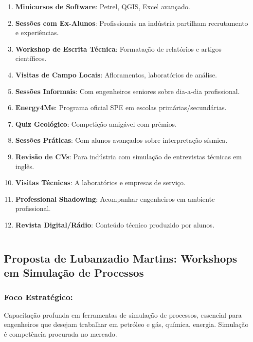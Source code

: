 \documentclass[12pt,a4paper]{article}
\begin{document}
\begin{enumerate}[itemsep=0.2cm]
    \item \textbf{Minicursos de Software}: Petrel, QGIS, Excel avançado.
    
    \item \textbf{Sessões com Ex-Alunos}: Profissionais na indústria partilham recrutamento e experiências.
    
    \item \textbf{Workshop de Escrita Técnica}: Formatação de relatórios e artigos científicos.
    
    \item \textbf{Visitas de Campo Locais}: Afloramentos, laboratórios de análise.
    
    \item \textbf{Sessões Informais}: Com engenheiros seniores sobre dia-a-dia profissional.
    
    \item \textbf{Energy4Me}: Programa oficial SPE em escolas primárias/secundárias.
    
    \item \textbf{Quiz Geológico}: Competição amigável com prémios.
    
    \item \textbf{Sessões Práticas}: Com alunos avançados sobre interpretação sísmica.
    
    \item \textbf{Revisão de CVs}: Para indústria com simulação de entrevistas técnicas em inglês.
    
    \item \textbf{Visitas Técnicas}: A laboratórios e empresas de serviço.
    
    \item \textbf{Professional Shadowing}: Acompanhar engenheiros em ambiente profissional.
    
    \item \textbf{Revista Digital/Rádio}: Conteúdo técnico produzido por alunos.
\end{enumerate}

\textcolor{spe-secondary}{\hspace{0.5cm}\rule{0.4\linewidth}{0.8pt}}
\subsection{Proposta de Lubanzadio Martins: Workshops em Simulação de Processos}

\subsubsection*{Foco Estratégico:}
Capacitação profunda em ferramentas de simulação de processos, essencial para engenheiros que desejam trabalhar em petróleo e gás, química, energia. Simulação é competência procurada no mercado.
\end{document}
